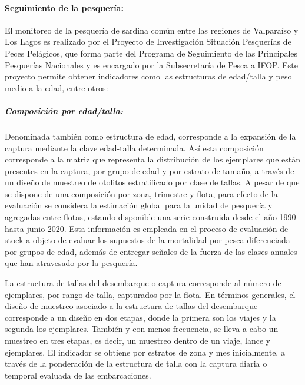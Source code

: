 \documentclass[
  spanish,
]{article}
\begin{document}
\normalsize

\hypertarget{seguimiento-de-la-pesqueruxeda}{%
\paragraph{Seguimiento de la
pesquería:}\label{seguimiento-de-la-pesqueruxeda}}

El monitoreo de la pesquería de sardina común entre las regiones de
Valparaíso y Los Lagos es realizado por el Proyecto de Investigación
Situación Pesquerías de Peces Pelágicos, que forma parte del Programa de
Seguimiento de las Principales Pesquerías Nacionales y es encargado por
la Subsecretaría de Pesca a IFOP. Este proyecto permite obtener
indicadores como las estructuras de edad/talla y peso medio a la edad,
entre otros:

\hypertarget{composiciuxf3n-por-edadtalla}{%
\subparagraph{Composición por
edad/talla:}\label{composiciuxf3n-por-edadtalla}}

Denominada también como estructura de edad, corresponde a la expansión
de la captura mediante la clave edad-talla determinada. Así esta
composición corresponde a la matriz que representa la distribución de
los ejemplares que están presentes en la captura, por grupo de edad y
por estrato de tamaño, a través de un diseño de muestreo de otolitos
estratificado por clase de tallas. A pesar de que se dispone de una
composición por zona, trimestre y flota, para efecto de la evaluación se
considera la estimación global para la unidad de pesquería y agregadas
entre flotas, estando disponible una serie construida desde el año 1990
hasta junio 2020. Esta información es empleada en el proceso de
evaluación de stock a objeto de evaluar los supuestos de la mortalidad
por pesca diferenciada por grupos de edad, además de entregar señales de
la fuerza de las clases anuales que han atravesado por la pesquería.

La estructura de tallas del desembarque o captura corresponde al número
de ejemplares, por rango de talla, capturados por la flota. En términos
generales, el diseño de muestreo asociado a la estructura de tallas del
desembarque corresponde a un diseño en dos etapas, donde la primera son
los viajes y la segunda los ejemplares. También y con menos frecuencia,
se lleva a cabo un muestreo en tres etapas, es decir, un muestreo dentro
de un viaje, lance y ejemplares. El indicador se obtiene por estratos de
zona y mes inicialmente, a través de la ponderación de la estructura de
talla con la captura diaria o temporal evaluada de las embarcaciones.
\end{document}
